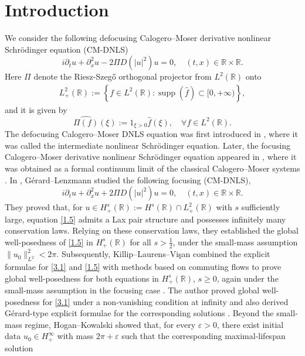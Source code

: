 \documentclass[10pt]{article}
\numberwithin{equation}{section}
\numberwithin{theorem}{section}
\begin{document}
\section{Introduction}
We consider the following defocusing Calogero--Moser derivative nonlinear Schrödinger equation (CM-DNLS)
\begin{equation}
\label{3.1}
i \partial_t u+\partial_x^2 u-2 \Pi D\left(|u|^2\right) u=0, \quad(t, x) \in \mathbb{R} \times \mathbb{R}.
\end{equation}
Here $\Pi$ denote the Riesz-Szeg\H{o} orthogonal projector from $L^2(\mathbb{R})$ onto 
\begin{align*}
L_{+}^2(\mathbb{R}):=\left\{f \in L^2(\mathbb{R}): \operatorname{supp}(\widehat{f}) \subset[0,+\infty)\right\},
\end{align*}
and it is given by
\begin{equation}
\widehat{\Pi(f)}(\xi):= 1_{\xi>0} \widehat{f}(\xi), \quad \forall f \in L^2(\mathbb{R}).
\end{equation}
The defocusing Calogero–Moser DNLS equation was first introduced in \cite{60}, where it was called the intermediate nonlinear Schrödinger equation. Later, the focusing Calogero–Moser derivative nonlinear Schrödinger equation appeared in \cite{22}, where it was obtained as a formal continuum limit of the classical Calogero–Moser systems \cite{37,38}. In \cite{5}, Gérard--Lenzmann studied the following focusing (CM-DNLS),
\begin{equation}
\label{1.5}
i \partial_t u+\partial_x^2 u+2\Pi D\left(|u|^2\right) u=0,\quad(t, x) \in \mathbb{R} \times \mathbb{R}.
\end{equation}
They proved that, for $u \in H_{+}^s(\mathbb{R}):=H^s(\mathbb{R})\cap L_{+}^2(\mathbb{R})$ with $s$ sufficiently large, equation \eqref{1.5} admits a Lax pair structure and possesses infinitely many conservation laws. Relying on these conservation laws, they established the global well-posedness of \eqref{1.5} in $H_{+}^s(\mathbb{R})$ for all $s>\tfrac12$, under the small-mass assumption $\|u_0\|_{L^2}^2<2\pi$. Subsequently, Killip--Laurens--Vi\c{s}an combined the explicit formulae for \eqref{3.1} and \eqref{1.5} with methods based on commuting flows to prove global well-posedness for both equations in $H_{+}^s(\mathbb{R})$, $s\geq 0$, again under the small-mass assumption in the focusing case \cite{2}. The author proved global well-posedness for \eqref{3.1} under a non-vanishing condition at infinity and also derived G\'erard-type explicit formulae for the corresponding solutions \cite{70}. Beyond the small-mass regime, Hogan--Kowalski showed that, for every $\varepsilon>0$, there exist initial data $u_0\in H_{+}^\infty$ with mass $2\pi+\varepsilon$ such that the corresponding maximal-lifespan solution
\end{document}
